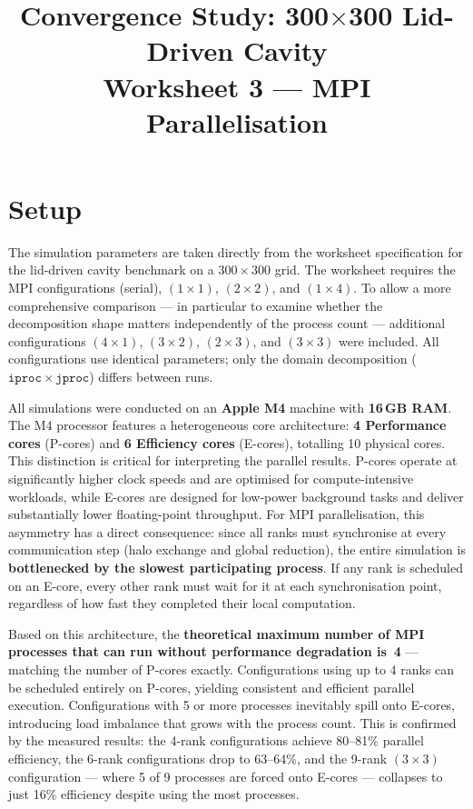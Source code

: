 \documentclass[11pt, a4paper]{article}
\title{\textbf{Convergence Study: 300$\times$300 Lid-Driven Cavity}\\
       \large Worksheet 3 --- MPI Parallelisation}
\author{}
\date{}
\begin{document}
\maketitle

\section{Setup}

The simulation parameters are taken directly from the worksheet specification
for the lid-driven cavity benchmark on a $300\times300$ grid. The worksheet
requires the MPI configurations (serial), $(1\times1)$, $(2\times2)$, and
$(1\times4)$. To allow a more comprehensive comparison --- in particular to
examine whether the decomposition shape matters independently of the process
count --- additional configurations $(4\times1)$, $(3\times2)$, $(2\times3)$,
and $(3\times3)$ were included. All configurations use identical parameters;
only the domain decomposition ($\mathtt{iproc} \times \mathtt{jproc}$) differs
between runs.

All simulations were conducted on an \textbf{Apple M4} machine with
\textbf{16\,GB RAM}. The M4 processor features a heterogeneous core
architecture: \textbf{4 Performance cores} (P-cores) and \textbf{6 Efficiency
cores} (E-cores), totalling 10 physical cores. This distinction is critical for
interpreting the parallel results. P-cores operate at significantly higher clock
speeds and are optimised for compute-intensive workloads, while E-cores are
designed for low-power background tasks and deliver substantially lower
floating-point throughput. For MPI parallelisation, this asymmetry has a direct
consequence: since all ranks must synchronise at every communication step (halo
exchange and global reduction), the entire simulation is \textbf{bottlenecked by
the slowest participating process}. If any rank is scheduled on an E-core, every
other rank must wait for it at each synchronisation point, regardless of how fast
they completed their local computation.

Based on this architecture, the \textbf{theoretical maximum number of MPI
processes that can run without performance degradation is~4} --- matching the
number of P-cores exactly. Configurations using up to 4 ranks can be scheduled
entirely on P-cores, yielding consistent and efficient parallel execution.
Configurations with 5 or more processes inevitably spill onto E-cores,
introducing load imbalance that grows with the process count. This is confirmed
by the measured results: the 4-rank configurations achieve 80--81\% parallel
efficiency, the 6-rank configurations drop to 63--64\%, and the 9-rank
$(3\times3)$ configuration --- where 5 of 9 processes are forced onto E-cores
--- collapses to just 16\% efficiency despite using the most processes.
\end{document}
